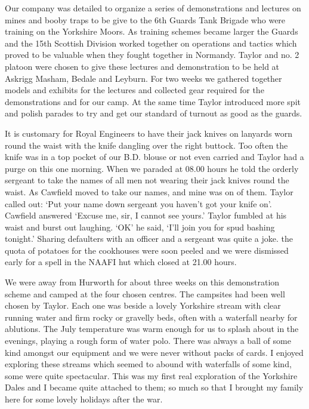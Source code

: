 Our company was detailed to organize a series of demonstrations and
lectures on mines and booby traps to be give to the 6th Guards Tank
Brigade who were training on the Yorkshire Moors. As training schemes
became larger the Guards and the 15th Scottish Division worked
together on operations and tactics which proved to be valuable when
they fought together in Normandy. \Lieutenant Taylor and no. 2 platoon
were chosen to give these lectures and demonstration to be held at
Askrigg Masham, Bedale and Leyburn. For two weeks we gathered
together models and exhibits for the lectures and collected gear
required for the demonstrations and for our camp. At the same time
\lieutenant Taylor introduced more spit and polish parades to try and
get our standard of turnout as good as the guards.

It is customary for Royal Engineers to have their jack knives on
lanyards worn round the waist with the knife dangling over the right
buttock. Too often the knife was in a top pocket of our B.D. blouse or
not even carried and \lieutenant Taylor had a purge on this one
morning. When we paraded at 08.00 hours he told the orderly sergeant
to take the names of all men not wearing their jack knives round the
waist. As \sergeant Cawfield moved to take our names, and mine was on
of them. \Lieutenant Taylor called out: `Put your name down sergeant
you haven't got your knife on'. \Sergeant Cawfield answered `Excuse
me, sir, I cannot see yours.'  \Lieutenant Taylor fumbled at his waist
and burst out laughing. `OK' he said, `I'll join you for spud bashing
tonight.'  Sharing defaulters with an officer and a sergeant was quite
a joke. the quota of potatoes for the cookhouses were soon peeled and
we were dismissed early for a spell in the NAAFI hut which closed at
21.00 hours.

We were away from Hurworth for about three weeks on this
demonstration scheme and camped at the four chosen centres. The
campsites had been well chosen by \lieutenant Taylor. Each one was
beside a lovely Yorkshire stream with clear running water and firm
rocky or gravelly beds, often with a waterfall nearby for ablutions.
The July temperature was warm enough for us to splash about in the
evenings, playing a rough form of water polo. There was always a ball
of some kind amongst our equipment and we were never without packs of
cards. I enjoyed exploring these streams which seemed to abound with
waterfalls of some kind, some were quite spectacular. This was my
first real exploration of the Yorkshire Dales and I became quite
attached to them; so much so that I brought my family here for some
lovely holidays after the war.

